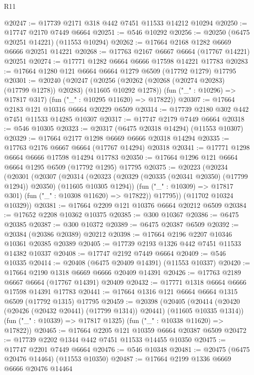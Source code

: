 \begin{lexlean}{R11}
\begin{coremodule}
@20247 := @17739 @2171 @318 @442 @7451 @11533 @14212 @10294
@20250 := @17747 @2170 @7449 @6664
@20251 := @546 @10292
@20256 := @20250 (@6475 @20251 @14221) (@11553 @10294)
@20262 := @17664 @2168 @1282 @6669 @6666 @20251 @14221
@20268 := @17763 @2167 @6667 @6664 (@17767 @14221) @20251
@20274 := @17771 @1282 @6664 @6666 @17598 @14221 @17783
@20283 := @17664 @1280 @121 @6664 @6664 @1279 @6509 (@17792 @1279) @17795
@20301 := @20240
    (@20247
      (@20256 (@20262 (@20268 (@20274 @20283) (@17799 @1278)) @20283) (@11605 @10292 @1278))
      (fun ("_" : @10296) => @17817 @317)
      (fun ("_" : @10295 @11620) => @17822))
@20307 := @17664 @2183 @121 @10316 @6664 @20229 @6509
@20314 := @17739 @2180 @302 @442 @7451 @11533 @14285 @10307
@20317 := @17747 @2179 @7449 @6664
@20318 := @546 @10305
@20323 := @20317 (@6475 @20318 @14294) (@11553 @10307)
@20329 := @17664 @2177 @1298 @6669 @6666 @20318 @14294
@20335 := @17763 @2176 @6667 @6664 (@17767 @14294) @20318
@20341 := @17771 @1298 @6664 @6666 @17598 @14294 @17783
@20350 := @17664 @1296 @121 @6664 @6664 @1295 @6509 (@17792 @1295) @17795
@20375 := @20223
    (@20234
      (@20301
        (@20307
          (@20314
            (@20323 (@20329 (@20335 (@20341 @20350) (@17799 @1294)) @20350) (@11605 @10305 @1294))
            (fun ("_" : @10309) => @17817 @301)
            (fun ("_" : @10308 @11620) => @17822))
          @17795))
      (@11702 @10324 @10329))
@20381 := @17664 @2209 @121 @10376 @6664 @20212 @6509
@20384 := @17652 @2208 @10362 @10375
@20385 := @300 @10367
@20386 := @6475 @20385
@20387 := @300 @10372
@20389 := @6475 @20387 @6509
@20392 := @20384 (@20386 @20389) @20212
@20398 := @17664 @2196 @2207 @10346 @10361 @20385 @20389
@20405 := @17739 @2193 @1326 @442 @7451 @11533 @14382 @10337
@20408 := @17747 @2192 @7449 @6664
@20409 := @546 @10335
@20414 := @20408 (@6475 @20409 @14391) (@11553 @10337)
@20420 := @17664 @2190 @1318 @6669 @6666 @20409 @14391
@20426 := @17763 @2189 @6667 @6664 (@17767 @14391) @20409
@20432 := @17771 @1318 @6664 @6666 @17598 @14391 @17783
@20441 := @17664 @1316 @121 @6664 @6664 @1315 @6509 (@17792 @1315) @17795
@20459 := @20398
    (@20405
      (@20414 (@20420 (@20426 (@20432 @20441) (@17799 @1314)) @20441) (@11605 @10335 @1314))
      (fun ("_" : @10339) => @17817 @1325)
      (fun ("_" : @10338 @11620) => @17822))
@20465 := @17664 @2205 @121 @10359 @6664 @20387 @6509
@20472 := @17739 @2202 @1344 @442 @7451 @11533 @14455 @10350
@20475 := @17747 @2201 @7449 @6664
@20476 := @546 @10348
@20481 := @20475 (@6475 @20476 @14464) (@11553 @10350)
@20487 := @17664 @2199 @1336 @6669 @6666 @20476 @14464

\end{coremodule}
\end{lexlean}

